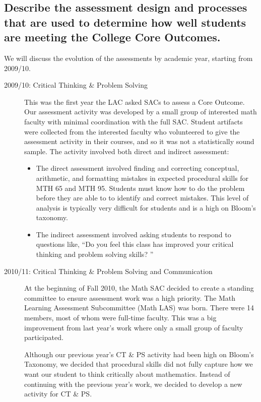\subsection[Core Outcome assessment design and process]{Describe the assessment design and processes that are used to
	determine how well students are meeting the College Core Outcomes.}
We will discuss the evolution of the assessments by academic year, starting from 2009/10.
\begin{description}
	\item [2009/10: Critical Thinking  \& Problem Solving]

	      This was the first year the LAC asked SACs to assess a Core Outcome.
	      Our assessment activity was developed by a small group of interested math faculty with minimal coordination with the full SAC.
	      Student artifacts were collected from the interested faculty who volunteered to give the assessment activity in their courses, and so it was not a statistically sound sample.
	      The activity involved both direct and indirect assessment:
	      \begin{itemize}
		      \item The direct assessment involved finding and correcting conceptual, arithmetic, and formatting mistakes in expected procedural skills for MTH 65 and MTH 95.
		            Students must know how to do the problem before they are able to to identify and correct mistakes.
		            This level of analysis is typically very difficult for students and is a high on Bloom's taxonomy.
		      \item The indirect assessment involved asking students to respond to questions like, ``Do you feel this class has improved your critical thinking and problem solving skills?
		            ''
	      \end{itemize}

	\item[2010/11:  Critical Thinking \& Problem Solving and Communication]

	      At the beginning of Fall 2010, the Math SAC decided to create a standing committee to ensure assessment work was a high priority.
	      The Math Learning Assessment Subcommittee (Math LAS) was born.
	      There were 14 members, most of whom were full-time faculty.
	      This was a big improvement from last year's work where only a small group of faculty participated.

	      Although our previous year's CT \& PS activity had been high on Bloom's Taxonomy, we decided that procedural skills did not fully capture how we want our student to think critically about mathematics.
	      Instead of continuing with the previous year's work, we decided to develop a new activity for CT \& PS.


\end{description}
